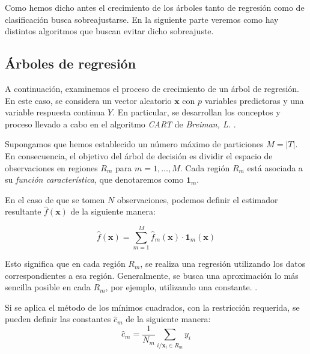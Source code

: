 \noindent Como hemos dicho antes el crecimiento de los árboles tanto de regresión como de clasificación busca sobreajustarse. En la siguiente parte veremos como hay distintos algoritmos que buscan evitar dicho sobreajuste. 

 

\subsection{Árboles de regresión }
\noindent A continuación, examinemos el  proceso de crecimiento de un árbol de regresión. En este caso, se considera un vector aleatorio $\mathbf{x}$ con $p$ variables predictoras y una variable respuesta continua $Y$. En particular, se desarrollan los conceptos y proceso llevado a cabo en el algoritmo \emph{CART} de \emph{Breiman, L.} \cite{Breiman 1984}. 

\noindent Supongamos que hemos establecido un número máximo de particiones $M=|T|$. En consecuencia, el objetivo del árbol de decisión es dividir el espacio de observaciones en regiones $R_m$ para $m=1,\ldots, M$. Cada región $R_m$ está asociada a su \emph{función característica}, que denotaremos como $\mathbf{1}_m$.

\noindent En el caso de que se tomen $N$ observaciones, podemos definir el estimador resultante $\hat{f}(\mathbf{x})$ de la siguiente manera:

\begin{equation}
\hat{f}(\mathbf{x})=\sum_{m=1}^M \hat{f}_m(\mathbf{x})\cdot \mathbf{1}_m(\mathbf{x})
\end{equation}

\noindent Esto significa que en cada región $R_m$, se realiza una regresión utilizando los datos correspondientes a esa región. Generalmente, se busca una aproximación lo más sencilla posible en cada $R_m$, por ejemplo, utilizando una constante. \cite{Hastie 2001,Biau 2016}.

\noindent Si se aplica el método de los mínimos cuadrados, con la restricción requerida, se pueden definir las constantes $\hat{c}_m$ de la siguiente manera:
\begin{equation}
\hat{c}_m=\dfrac{1}{N_m}\sum_{i/\mathbf{x}_i\in R_m} y_i
\end{equation}

